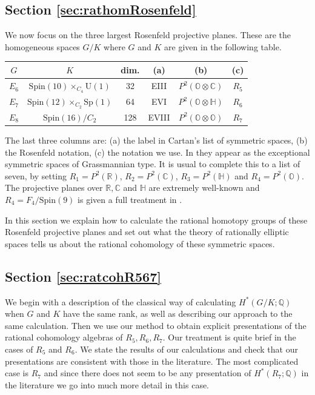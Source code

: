 \documentclass[twoside,a4paper,reqno,11pt]{amsart}
\newcommand{\C}{\mathbb{C}}
\renewcommand{\H}{\mathbb{H}}
\renewcommand{\O}{\mathbb{O}}
\newcommand{\Q}{\mathbb{Q}}
\newcommand{\R}{\mathbb{R}}
\renewcommand{\o}{\otimes}
\newcommand{\U}{\mathrm{U}}
\newcommand{\Spin}{\mathrm{Spin}}
\newcommand{\Sp}{\mathrm{Sp}}
\begin{document}
\subsection*{Section \ref{sec:rathomRosenfeld}}
We now focus on the three largest Rosenfeld projective planes. These are the  homogeneous spaces $G/K$ where $G$ and $K$ are given in the following table.
\begin{center}
\begin{tabular}{ | c | c | c | c | c | c | }
\hline
$G$ & $K$ & dim. & (a) & (b) & (c) \\
\hline
$E_6$ & $\Spin(10)\times_{C_4} \U(1)$ & 32  & EIII & $P^2(\O \o \C)$  & $R_5$ \\
\hline
$E_7$ & $\Spin(12)\times_{C_2}\Sp(1)$ & 64  & EVI & $P^2(\O \o \H)$ & $R_6$ \\
\hline
$E_8$  & $\Spin(16)/C_2$ & 128 & EVIII & $P^2(\O\o\O)$ & $R_7$ \\
\hline
\end{tabular}
\end{center}
The last three columns are: (a) the label in Cartan's list of symmetric spaces, (b) the Rosenfeld notation, (c) the notation we use.
In \cite[Table~2]{MR2785763} they appear as the exceptional symmetric spaces of Grassmannian type.  It is usual to complete this to a list of seven, by setting $R_1 = P^2(\R)$, $R_2 = P^2(\C)$, $R_3 = P^2(\H)$ and $R_4 = P^2(\O)$. The projective planes over $\R, \C$ and $\H$ are extremely well-known and $R_4 = F_4 / \Spin(9)$ is given a full treatment in \cite[Chapter~5, Section~19]{MR0102800}. 

In this section we explain how to calculate the rational homotopy groups of these Rosenfeld projective planes and set out what the theory of rationally elliptic spaces tells us about the rational cohomology of these symmetric spaces.
  
\subsection*{Section \ref{sec:ratcohR567}}

We begin with a description of the classical way of calculating $H^*(G/K; \Q)$ when $G$ and $K$ have the same rank, as well as describing our approach to the same calculation. Then we use our method to obtain explicit presentations of the rational cohomology algebras of $R_5, R_6, R_7$. Our treatment is quite brief in the cases of $R_5$ and $R_6$. We state the results of our calculations and check that our presentations are consistent with those in the literature. The most complicated case is $R_7$ and since there does not seem to be any presentation of $H^*(R_7; \Q)$ in the literature we go into much more detail in this case. 
\end{document}

